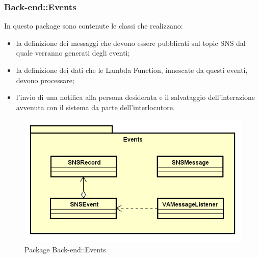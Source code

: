 \subsubsection{Back-end::Events}
In questo package sono contenute le classi che realizzano:
\begin{itemize}
 \item la definizione dei messaggi che devono essere pubblicati sul topic SNS dal quale verranno generati degli eventi;
 \item la definizione dei dati che le Lambda Function, innescate da questi eventi, devono processare;
 \item l'invio di una notifica alla persona desiderata e il salvataggio dell'interazione avvenuta con il sistema da parte dell'interlocutore.
\end{itemize}
\begin{figure}[h] \centering \includegraphics[width=\textwidth,height=\textheight,keepaspectratio]{images/diagrams/back-end/Official_Backend_0304/Events.png}
	\caption{Package Back-end::Events}
\end{figure}
